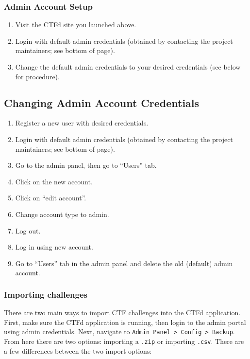\documentclass[11pt]{article}
\begin{document}
\subsubsection{Admin Account Setup}

\begin{enumerate}
	\item Visit the CTFd site you launched above.
	\item Login with default admin credentials (obtained by contacting the project maintainers; see bottom of page).
	\item Change the default admin credentials to your desired credentials (see below for procedure).
\end{enumerate}

\subsection{Changing Admin Account Credentials}

\begin{enumerate}
	\item Register a new user with desired credentials.
	\item Login with default admin credentials (obtained by contacting the project maintainers; see bottom of page).
	\item Go to the admin panel, then go to ``Users'' tab.
	\item Click on the new account.
	\item Click on ``edit account''.
	\item Change account type to admin.
	\item Log out.
	\item Log in using new account.
	\item Go to ``Users'' tab in the admin panel and delete the old (default) admin account.
\end{enumerate}

\subsubsection{Importing challenges}

There are two main ways to import CTF challenges into the CTFd application.
First, make sure the CTFd application is running, then login to the admin portal using admin credentials.
Next, navigate to \texttt{Admin Panel > Config > Backup}.
From here there are two options: importing a \texttt{.zip} or importing \texttt{.csv}.
There are a few differences between the two import options:
\end{document}
